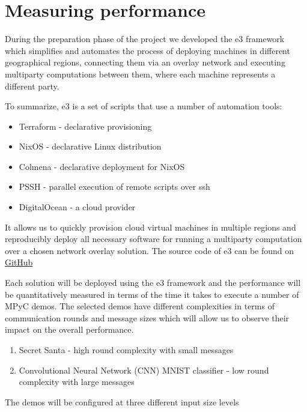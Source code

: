 \hypertarget{measuring-performance}{%
\section{Measuring performance}\label{measuring-performance}}

During the preparation phase of the project we developed the \gls{e3}
framework which simplifies and automates the process of deploying
machines in different geographical regions, connecting them via an
overlay network and executing multiparty computations between them,
where each machine represents a different party.

To summarize, \gls{e3} is a set of scripts that use a number of
automation tools:

\begin{itemize}
\tightlist
\item
  Terraform - declarative provisioning
\item
  NixOS - declarative Linux distribution
\item
  Colmena - declarative deployment for NixOS
\item
  PSSH - parallel execution of remote scripts over ssh
\item
  DigitalOcean - a cloud provider
\end{itemize}

It allows us to quickly provision cloud virtual machines in multiple
regions and reproducibly deploy all necessary software for running a
multiparty computation over a chosen network overlay solution. The
source code of \gls{e3} can be found on
\href{https://github.com/e-nikolov/mpyc}{GitHub}

Each solution will be deployed using the \gls{e3} framework and the
performance will be quantitatively measured in terms of the time it
takes to execute a number of MPyC demos. The selected demos have
different complexities in terms of communication rounds and message
sizes which will allow us to observe their impact on the overall
performance.

\begin{enumerate}
\def\labelenumi{\arabic{enumi}.}
\tightlist
\item
  Secret Santa - high round complexity with small messages
\item
  Convolutional Neural Network (CNN) MNIST classifier - low round
  complexity with large messages
\end{enumerate}

The demos will be configured at three different input size levels

